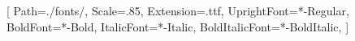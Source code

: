 \usepackage{fontspec}

\setmonofont{JetBrainsMonoNL}[
    Path=./fonts/,
    Scale=.85,
    Extension=.ttf,
    UprightFont=*-Regular,
    BoldFont=*-Bold,
    ItalicFont=*-Italic,
    BoldItalicFont=*-BoldItalic,
]
